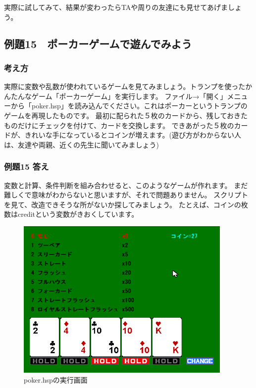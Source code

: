 実際に試してみて、結果が変わったらTAや周りの友達にも見せてあげましょう。

\clearpage
\subsection{例題15　ポーカーゲームで遊んでみよう}

\subsubsection*{考え方}

実際に変数や乱数が使われているゲームを見てみましょう。トランプを使ったかんたんなゲーム「ポーカーゲーム」を実行します。
ファイル→「開く」メニューから「poker.hsp」を読み込んでください。これはポーカーというトランプのゲームを再現したものです。
最初に配られた５枚のカードから、残しておきたものだけにチェックを付けて、カードを交換します。
できあがった５枚のカードが、きれいな手になっているとコインが増えます。(遊び方がわからない人は、友達や両親、近くの先生に聞いてみましょう)

\subsubsection*{例題15 答え}

変数と計算、条件判断を組み合わせると、このようなゲームが作れます。
まだ難しくで意味がわからないと思いますが、それで問題ありません。
スクリプトを見て、改造できそうな所がないか探してみましょう。
たとえば、コインの枚数はcreditという変数がきおくしています。

\begin{figure}[H]
    \begin{center}
        \includegraphics[keepaspectratio,width=10.478cm,height=7.844cm]{text02-img/text02-img053.png}
        \caption{poker.hspの実行画面}
    \end{center}
\end{figure}

